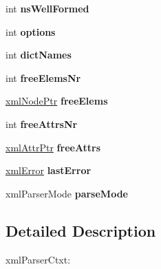 \begin{DoxyCompactItemize}
\item 
\hypertarget{struct__xml_parser_ctxt_a15f8e8be481f79a4636e643f72d464b0}{int {\bfseries ns\-Well\-Formed}}\label{struct__xml_parser_ctxt_a15f8e8be481f79a4636e643f72d464b0}

\item 
\hypertarget{struct__xml_parser_ctxt_a5f58199ceeb59e5faa1a6ea6d5a73502}{int {\bfseries options}}\label{struct__xml_parser_ctxt_a5f58199ceeb59e5faa1a6ea6d5a73502}

\item 
\hypertarget{struct__xml_parser_ctxt_a6e8ea51dd2f12067ebff135091cd97ed}{int {\bfseries dict\-Names}}\label{struct__xml_parser_ctxt_a6e8ea51dd2f12067ebff135091cd97ed}

\item 
\hypertarget{struct__xml_parser_ctxt_a47e2bf49432ad708a09298a8f441dbf3}{int {\bfseries free\-Elems\-Nr}}\label{struct__xml_parser_ctxt_a47e2bf49432ad708a09298a8f441dbf3}

\item 
\hypertarget{struct__xml_parser_ctxt_af6e6f367f0455e32cf2050fecf0f2647}{\hyperlink{struct__xml_node}{xml\-Node\-Ptr} {\bfseries free\-Elems}}\label{struct__xml_parser_ctxt_af6e6f367f0455e32cf2050fecf0f2647}

\item 
\hypertarget{struct__xml_parser_ctxt_a505367ee1fc8289be00afd4217a169be}{int {\bfseries free\-Attrs\-Nr}}\label{struct__xml_parser_ctxt_a505367ee1fc8289be00afd4217a169be}

\item 
\hypertarget{struct__xml_parser_ctxt_ac5c4d7b54b7e19da0256b7eacb5a159b}{\hyperlink{struct__xml_attr}{xml\-Attr\-Ptr} {\bfseries free\-Attrs}}\label{struct__xml_parser_ctxt_ac5c4d7b54b7e19da0256b7eacb5a159b}

\item 
\hypertarget{struct__xml_parser_ctxt_a06c58f3bc22c0d7c1ce76d607a5f44a9}{\hyperlink{struct__xml_error}{xml\-Error} {\bfseries last\-Error}}\label{struct__xml_parser_ctxt_a06c58f3bc22c0d7c1ce76d607a5f44a9}

\item 
\hypertarget{struct__xml_parser_ctxt_a000fedcc192734e86f5d4544b7ef12e1}{xml\-Parser\-Mode {\bfseries parse\-Mode}}\label{struct__xml_parser_ctxt_a000fedcc192734e86f5d4544b7ef12e1}

\end{DoxyCompactItemize}


\subsection{Detailed Description}
xml\-Parser\-Ctxt\-:

